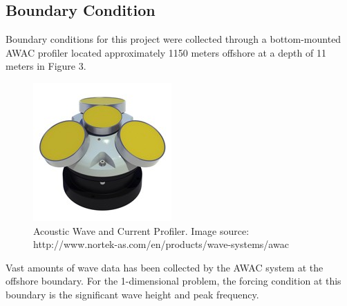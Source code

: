 \subsection{Boundary Condition}
\label{BC}

	Boundary conditions for this project were collected through a bottom-mounted AWAC profiler located approximately 1150 meters offshore at a depth of 11 meters in Figure 3.%

	\begin{figure}[H]%
		\centering
		\includegraphics[width=.20\linewidth]{img/AWAC.jpg}
		\caption{Acoustic Wave and Current Profiler. 
		Image source: http://www.nortek-as.com/en/products/wave-systems/awac}
		\label{AWAC}
	\end{figure}
	
	Vast amounts of wave data has been collected by the AWAC system at the offshore boundary. For the 1-dimensional problem, the forcing condition at this boundary is the significant wave height and peak frequency.